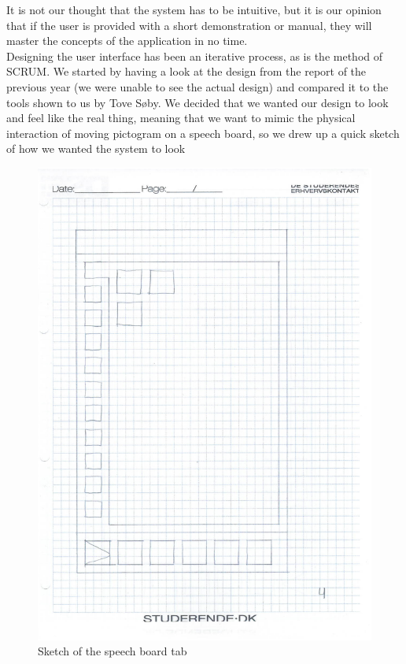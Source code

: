 It is not our thought that the system has to be intuitive, but it is our opinion that if the user is provided with a short demonstration or manual, they will master the concepts of the application in no time.\newline
\\
Designing the user interface has been an iterative process, as is the method of SCRUM. We started by having a look at the design from the report of the previous year (we were unable to see the actual design) and compared it to the tools shown to us by Tove S\o{}by.\newline%
We decided that we wanted our design to look and feel like the real thing, meaning that we want to mimic the physical interaction of moving pictogram on a speech board, so we drew up a quick sketch of how we wanted the system to look\newline
\begin{figure}[htbp]
	\centering
		\includegraphics[scale=0.50]{input/images/speechboard_sketch.pdf}
		\caption{Sketch of the speech board tab}
	\label{fig:speechboard_sketch}
\end{figure}
